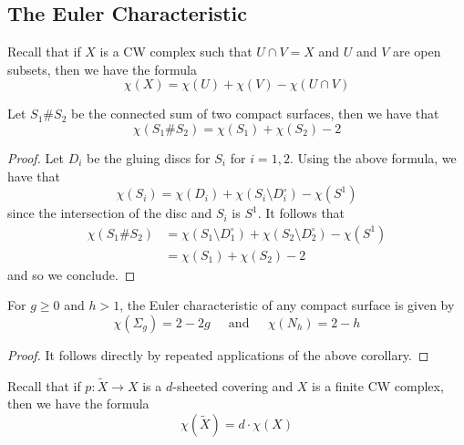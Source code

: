 \documentclass[a4paper]{article}
\begin{document}
\subsection{The Euler Characteristic}
Recall that if $X$ is a CW complex such that $U\cap V=X$ and $U$ and $V$ are open subsets, then we have the formula $$\chi(X)=\chi(U)+\chi(V)-\chi(U\cap V)$$

\begin{crl}{}{} Let $S_1\# S_2$ be the connected sum of two compact surfaces, then we have that $$\chi(S_1\# S_2)=\chi(S_1)+\chi(S_2)-2$$ \tcbline
\begin{proof}
Let $D_i$ be the gluing discs for $S_i$ for $i=1,2$. Using the above formula, we have that $$\chi(S_i)=\chi(D_i)+\chi(S_i\setminus D_i^\circ)-\chi(S^1)$$ since the intersection of the disc and $S_i$ is $S^1$. It follows that 
\begin{align*}
\chi(S_1\# S_2)&=\chi(S_1\setminus D_1^\circ)+\chi(S_2\setminus D_2^\circ)-\chi(S^1)\\
&=\chi(S_1)+\chi(S_2)-2
\end{align*}
and so we conclude. 
\end{proof}
\end{crl}

\begin{crl}{}{} For $g\geq 0$ and $h>1$, the Euler characteristic of any compact surface is given by $$\chi(\Sigma_g)=2-2g\;\;\;\;\text{ and }\;\;\;\;\chi(N_h)=2-h$$ \tcbline
\begin{proof}
It follows directly by repeated applications of the above corollary. 
\end{proof}
\end{crl}

Recall that if $p:\tilde{X}\to X$ is a $d$-sheeted covering and $X$ is a finite CW complex, then we have the formula $$\chi(\tilde{X})=d\cdot\chi(X)$$
\end{document}
